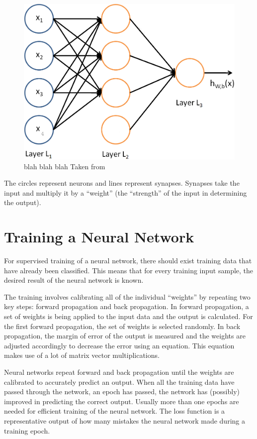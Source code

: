 \begin{figure}[H]
  \centering
  \includegraphics[width=\textwidth]{images/mysimplerernn.png}
  \caption{blah blah blah Taken from \cite{nnarticle3}}
  \label{fig:simplerernn}
\end{figure}

The circles represent neurons and lines represent synapses. Synapses take the input and multiply it by a “weight” (the “strength” of the input in determining the output). 

\section{Training a Neural Network}

For supervised training of a neural network, there should exist training data that have already been classified. This means that for every training input sample, the desired result of the neural network is known. 

The training involves calibrating all of the individual “weights” by repeating two key steps: forward propagation and back propagation. In forward propagation, a set of weights is being applied to the input data and the output is calculated. For the first forward propagation, the set of weights is selected randomly. In back propagation, the margin of error of the output is measured and the weights are adjusted accordingly to decrease the error using an equation.  This equation makes use of a lot of matrix vector multiplications.

Neural networks repeat forward and back propagation until the weights are calibrated to accurately predict an output. When all the training data have passed through the network, an epoch has passed, the network has (possibly) improved in predicting the correct output. Usually more than one epochs are needed for efficient training of the neural network. The loss function is a representative output of how many mistakes the neural network made during a training epoch.

